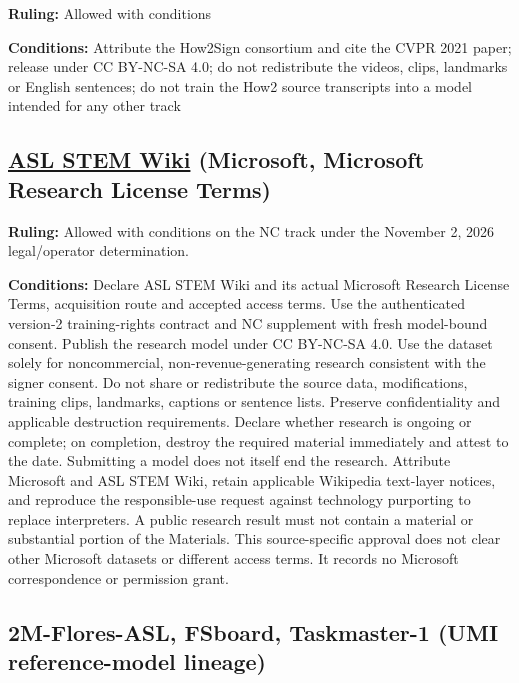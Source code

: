 \documentclass[10pt,a4paper]{article}
\begin{document}
\textbf{Ruling:} Allowed with conditions

\textbf{Conditions:} Attribute the How2Sign consortium and cite the CVPR
2021 paper; release under CC BY-NC-SA 4.0; do not redistribute the
videos, clips, landmarks or English sentences; do not train the How2
source transcripts into a model intended for any other track

\subsection{\texorpdfstring{\href{https://www.microsoft.com/en-us/research/project/asl-stem-wiki/}{ASL
STEM Wiki} (Microsoft, Microsoft Research License
Terms)}{ASL STEM Wiki (Microsoft, Microsoft Research License Terms)}}\label{asl-stem-wiki-microsoft-microsoft-research-license-terms}

\textbf{Ruling:} Allowed with conditions on the NC track under the
November 2, 2026 legal/operator determination.

\textbf{Conditions:} Declare ASL STEM Wiki and its actual Microsoft
Research License Terms, acquisition route and accepted access terms.
Use the authenticated version-2 training-rights contract and NC
supplement with fresh model-bound consent. Publish the research model
under CC BY-NC-SA 4.0. Use the dataset solely for noncommercial,
non-revenue-generating research consistent with the signer consent.
Do not share or redistribute the source data, modifications, training
clips, landmarks, captions or sentence lists. Preserve confidentiality
and applicable destruction requirements. Declare whether research is
ongoing or complete; on completion, destroy the required material
immediately and attest to the date. Submitting a model does not itself
end the research. Attribute Microsoft and ASL STEM Wiki, retain applicable
Wikipedia text-layer notices, and reproduce the responsible-use
request against technology purporting to replace interpreters. A public
research result must not contain a material or substantial portion of
the Materials. This source-specific approval does not clear other
Microsoft datasets or different access terms. It records no Microsoft
correspondence or permission grant.

\subsection{2M-Flores-ASL, FSboard, Taskmaster-1 (UMI reference-model
lineage)}\label{2m-flores-asl-fsboard-taskmaster-1-umi-reference-model-lineage}
\end{document}
